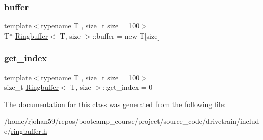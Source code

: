 \subsubsection{\texorpdfstring{buffer}{buffer}}
{\footnotesize\ttfamily template$<$typename T , size\+\_\+t size = 100$>$ \\
T$\ast$ \hyperlink{classRingbuffer}{Ringbuffer}$<$ T, size $>$\+::buffer = new T\mbox{[}size\mbox{]}\hspace{0.3cm}{\ttfamily [private]}}

\mbox{\label{classRingbuffer_a36eb74b7c7e5aa2f5804f9565b247306}} 
\subsubsection{\texorpdfstring{get\+\_\+index}{get\_index}}
{\footnotesize\ttfamily template$<$typename T , size\+\_\+t size = 100$>$ \\
size\+\_\+t \hyperlink{classRingbuffer}{Ringbuffer}$<$ T, size $>$\+::get\+\_\+index = 0\hspace{0.3cm}{\ttfamily [private]}}



The documentation for this class was generated from the following file\+:\begin{DoxyCompactItemize}
\item 
/home/rjohan59/repos/bootcamp\+\_\+course/project/source\+\_\+code/drivetrain/include/\hyperlink{ringbuffer_8h}{ringbuffer.\+h}\end{DoxyCompactItemize}
